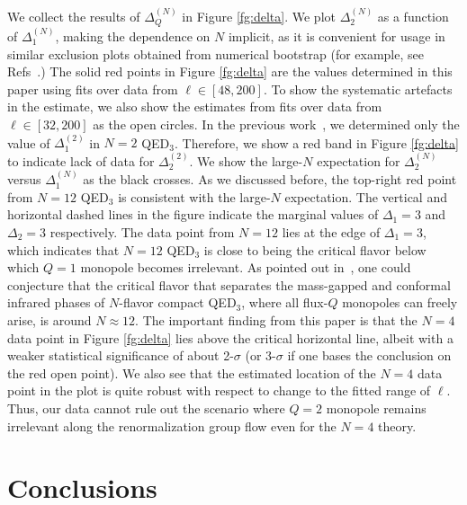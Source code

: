\documentclass[prd, onecolumn, superscriptaddress, nofootinbib, notitlepage, floatfix]{revtex4-1}
\newcommand\fgn[1]{Figure \ref{fg:#1}}
\begin{document}
We collect the results of $\Delta_Q^{(N)}$ in \fgn{delta}. We plot
$\Delta_2^{(N)}$ as a function of $\Delta_1^{(N)}$, making the
dependence on $N$ implicit, as it is convenient for usage in similar
exclusion plots obtained from numerical bootstrap (for
example, see Refs~\cite{Albayrak:2021xtd,He:2021sto}.)  The solid red
points in \fgn{delta} are the values determined in this paper using
fits over data from $\ell\in[48,200]$.  To show the systematic
artefacts in the estimate, we also show the estimates from fits
over data from $\ell\in[32,200]$ as the open circles.  In the
previous work~\cite{Karthik:2019mrr}, we determined only the value
of $\Delta_1^{(2)}$ in  $N=2$ QED$_3$.  Therefore, we show a red
band in \fgn{delta} to indicate lack of data for $\Delta_2^{(2)}$.
We show the large-$N$ expectation for $\Delta_2^{(N)}$ versus
$\Delta_1^{(N)}$ as the black crosses.  As we discussed before, the
top-right red point from $N=12$ QED$_3$ is consistent with the
large-$N$ expectation.  The vertical and horizontal dashed lines
in the figure indicate the marginal values of $\Delta_1=3$ and
$\Delta_2=3$ respectively.  The data point from $N=12$ lies at the edge
of $\Delta_1=3$, which indicates that $N=12$ QED$_3$ is close to being the
critical flavor below which $Q=1$ monopole becomes irrelevant. As
pointed out in~\cite{Pufu:2013vpa}, one could conjecture that the
critical flavor that separates the mass-gapped and conformal infrared
phases of $N$-flavor compact QED$_3$, where all flux-$Q$ monopoles
can freely arise, is around $N\approx 12$. The important finding
from this paper is that the $N=4$ data point in \fgn{delta} lies
above the critical horizontal line, albeit with a weaker statistical
significance of about 2-$\sigma$ (or 3-$\sigma$ if one bases the conclusion on 
the red open point).  We also see that the estimated
location of the $N=4$ data point in the plot is quite robust with
respect to change to the fitted range of $\ell$.  Thus, our data
cannot rule out the scenario where $Q=2$ monopole remains irrelevant
along the renormalization group flow even for the
$N=4$ theory.


\section{Conclusions}
\end{document}
